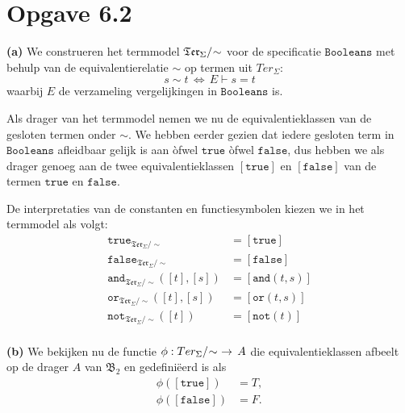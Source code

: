 \documentclass[a4paper,11pt]{article}
\begin{document}
\section*{Opgave 6.2}

\begin{description}

\item{\bf (a)} %
We construeren het termmodel $\mathfrak{Ter}_{\Sigma}/\negmedspace\sim$ voor de
specificatie $\texttt{Booleans}$ met behulp van de equivalentierelatie $\sim$
op termen uit $Ter_{\Sigma}$:
\begin{displaymath}
s \sim t \, \Longleftrightarrow \, E \vdash s = t
\end{displaymath}
waarbij $E$ de verzameling vergelijkingen in $\texttt{Booleans}$ is.

Als drager van het termmodel nemen we nu de equivalentieklassen van de
gesloten termen onder $\sim$. We hebben eerder gezien dat iedere gesloten term
in $\texttt{Booleans}$ afleidbaar gelijk is aan \`ofwel $\texttt{true}$
\`ofwel $\texttt{false}$, dus hebben we als drager genoeg aan de twee
equivalentieklassen $[\texttt{true}]$ en $[\texttt{false}]$ van de termen
$\texttt{true}$ en $\texttt{false}$.

De interpretaties van de constanten en functiesymbolen kiezen we in het
termmodel als volgt:
\begin{align*}
\texttt{true}_{\mathfrak{Ter}_{\Sigma}/\sim}         &= [\texttt{true}] \\
\texttt{false}_{\mathfrak{Ter}_{\Sigma}/\sim}        &= [\texttt{false}] \\
\texttt{and}_{\mathfrak{Ter}_{\Sigma}/\sim}([t],[s]) &= [\texttt{and}(t,s)] \\
\texttt{or}_{\mathfrak{Ter}_{\Sigma}/\sim}([t],[s])  &= [\texttt{or}(t,s)] \\
\texttt{not}_{\mathfrak{Ter}_{\Sigma}/\sim}([t])     &= [\texttt{not}(t)] \\
\end{align*}

\item{\bf (b)} %
We bekijken nu de functie $\phi : Ter_{\Sigma}/\negmedspace\sim \,\,
\rightarrow \, A$ die equivalentieklassen afbeelt op de drager $A$ van
$\mathfrak{B}_{2}$ en gedefini\"eerd is als
\begin{align*}
\phi([\texttt{true}])  &= T, \\
\phi([\texttt{false}]) &= F.
\end{align*}


\end{description}
\end{document}
